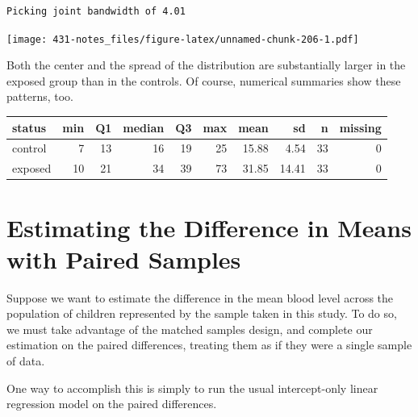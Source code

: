 \documentclass[
]{book}
\newenvironment{Shaded}{\begin{snugshade}}{\end{snugshade}}
\newcommand{\DataTypeTok}[1]{\textcolor[rgb]{0.13,0.29,0.53}{#1}}
\newcommand{\DecValTok}[1]{\textcolor[rgb]{0.00,0.00,0.81}{#1}}
\newcommand{\FloatTok}[1]{\textcolor[rgb]{0.00,0.00,0.81}{#1}}
\newcommand{\KeywordTok}[1]{\textcolor[rgb]{0.13,0.29,0.53}{\textbf{#1}}}
\newcommand{\NormalTok}[1]{#1}
\newcommand{\OperatorTok}[1]{\textcolor[rgb]{0.81,0.36,0.00}{\textbf{#1}}}
\newcommand{\OtherTok}[1]{\textcolor[rgb]{0.56,0.35,0.01}{#1}}
\newcommand{\StringTok}[1]{\textcolor[rgb]{0.31,0.60,0.02}{#1}}
\begin{document}
\begin{verbatim}
Picking joint bandwidth of 4.01
\end{verbatim}

\texttt{[image: 431-notes\_files/figure-latex/unnamed-chunk-206-1.pdf]}

Both the center and the spread of the distribution are substantially larger in the exposed group than in the controls. Of course, numerical summaries show these patterns, too.

\begin{Shaded}
\end{Shaded}

\begin{tabular}{l|r|r|r|r|r|r|r|r|r}
\hline
status & min & Q1 & median & Q3 & max & mean & sd & n & missing\\
\hline
control & 7 & 13 & 16 & 19 & 25 & 15.88 & 4.54 & 33 & 0\\
\hline
exposed & 10 & 21 & 34 & 39 & 73 & 31.85 & 14.41 & 33 & 0\\
\hline
\end{tabular}

\hypertarget{estimating-the-difference-in-means-with-paired-samples}{%
\section{Estimating the Difference in Means with Paired Samples}\label{estimating-the-difference-in-means-with-paired-samples}}

Suppose we want to estimate the difference in the mean blood level across the population of children represented by the sample taken in this study. To do so, we must take advantage of the matched samples design, and complete our estimation on the paired differences, treating them as if they were a single sample of data.

One way to accomplish this is simply to run the usual intercept-only linear regression model on the paired differences.

\begin{Shaded}
\end{Shaded}
\end{document}
